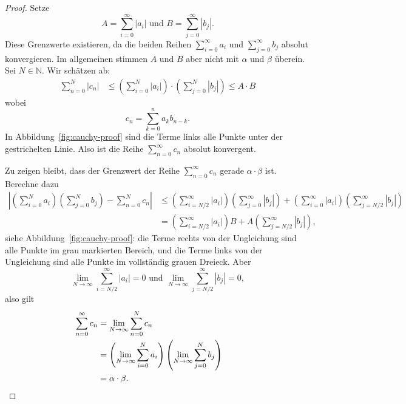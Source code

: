 \documentclass[../main.tex]{subfiles}
\begin{document}

\begin{proof}
  Setze
  \[
    A = \sum_{i=0}^{\infty} |a_i| \text{ und }
    B = \sum_{j=0}^{\infty} |b_j|.
  \]
  Diese Grenzwerte existieren, da die beiden Reihen
  $\sum_{i=0}^{\infty} a_i$ und $\sum_{j=0}^{\infty} b_j$ 
  absolut konvergieren. Im allgemeinen stimmen $A$ und $B$
  aber nicht mit $\alpha$ und $\beta$ überein.
  Sei $N \in \mathbb{N}$. Wir schätzen ab:
  \begin{align*}
    \sum_{n=0}^{N} |c_n| &
    \leq \left(\sum_{i=0}^{N} |a_i|\right)
    \cdot \left( \sum_{j=0}^{N} |b_j| \right) \leq A \cdot B
  \end{align*}
  wobei
  \[
    c_n = \sum_{k=0}^{n} a_k b_{n-k}.
  \]
  In Abbildung~\ref{fig:cauchy-proof}
  sind die Terme links alle
  Punkte unter der
  gestrichelten Linie.
  Also ist die Reihe $\sum_{n=0}^{\infty} c_n$ absolut
  konvergent.

  Zu zeigen bleibt, dass der Grenzwert der Reihe
  $\sum_{n=0}^{\infty} c_n$ gerade $\alpha \cdot \beta$ 
  ist. Berechne dazu
  \begin{align*}
    \left| \left( \sum_{i=0}^{N} a_i \right)
    \left( \sum_{j=0}^{N} b_j \right) - \sum_{n=0}^{N} c_n \right| 
    & \leq \left(\sum_{i=N/2}^{\infty} |a_i| \right)
     \left( \sum_{j=0}^{\infty} |b_j| \right)
     + \left( \sum_{i=0}^{\infty} |a_i| \right)
     \left( \sum_{j=N/2}^{\infty} |b_j| \right)\\
    &= \left( \sum_{i=N/2}^{\infty} |a_i| \right) B
    + A \left( \sum_{j=N/2}^{\infty} |b_j| \right),
  \end{align*}
  siehe Abbildung~\ref{fig:cauchy-proof}: die
  Terme rechts von der Ungleichung sind alle Punkte
  im grau markierten Bereich,
  und die Terme links von der Ungleichung
  sind alle Punkte im vollständig grauen Dreieck.
  Aber
  \[
    \lim_{N \to \infty} \sum_{i=N/2}^{\infty} |a_i| = 0
    \text{ und }
    \lim_{N \to \infty} \sum_{j=N/2}^{\infty} |b_j| = 0,
  \]
  also gilt
  \begin{align*}
    \sum_{n=0}^{\infty} c_n 
    & = \lim_{N \to \infty} \sum_{n=0}^{N} c_n \\
    & = \left( \lim_{N \to \infty}\sum_{i=0}^{N} a_i \right)
    \left( \lim_{N \to \infty}\sum_{j=0}^{N} b_j \right) \\
    & = \alpha \cdot \beta. && \qedhere
  \end{align*}
\end{proof}
\end{document}
